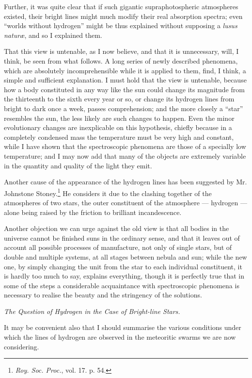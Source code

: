 \documentclass[a4paper, 12pt, oneside, polutonikogreek, english]{article}
\begin{document}
Further, it was quite clear that if such gigantic supraphotospheric atmospheres existed, their bright lines might much modify their real absorption spectra; even ``worlds without hydrogen'' might be thus explained without supposing a \emph{lusus naturæ}, and so I explained them.

That this view is untenable, as I now believe, and that it is unnecessary, will, I think, be seen from what follows. A long series of newly described phenomena, which are absolutely incomprehensible while it is applied to them, find, I think, a simple and sufficient explanation. I must hold that the view is untenable, because how a body constituted in any way like the sun could change its magnitude from the thirteenth to the sixth every year or so, or change its hydrogen lines from bright to dark once a week, passes comprehension; and the more closely a ``star'' resembles the sun, the less likely are such changes to happen. Even the minor evolutionary changes are inexplicable on this hypothesis, chiefly because in a completely condensed mass the temperature must be very high and constant, while I have shown that the spectroscopic phenomena are those of a specially low temperature; and I may now add that many of the objects are extremely variable in the quantity and quality of the light they emit.

Another cause of the appearance of the hydrogen lines has been suggested by Mr. Johnstone Stoney.\footnote{\emph{Roy. Soc. Proc.}, vol. 17. p. 54.} He considers it due to the clashing together of the atmospheres of two stars, the outer constituent of the atmosphere --- hydrogen --- alone being raised by the friction to brilliant incandescence.

Another objection we can urge against the old view is that all bodies in the universe cannot be finished suns in the ordinary sense, and that it leaves out of account all possible processes of manufacture, not only of single stars, but of double and multiple systems, at all stages between nebula and sun; while the new one, by simply changing the unit from the star to each individual constituent, it is hardly too much to say, explains everything, though it is perfectly true that in some of the steps a considerable acquaintance with spectroscopic phenomena is necessary to realise the beauty and the stringency of the solutions.

\emph{The Question of Hydrogen in the Case of Bright-line Stars.}

It may be convenient also that I should summarise the various conditions under which the lines of hydrogen are observed in the meteoritic swarms we are now considering.
\end{document}

